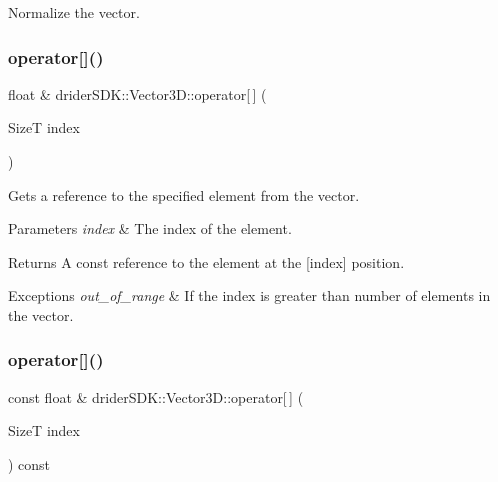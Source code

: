 Normalize the vector. \mbox{\label{classdrider_s_d_k_1_1_vector3_d_ac7f67c8043cc9f9d801a7e7a2f2580a7}} 
\subsubsection{\texorpdfstring{operator[]()}{operator[]()}\hspace{0.1cm}{\footnotesize\ttfamily [1/2]}}
{\footnotesize\ttfamily float \& drider\+S\+D\+K\+::\+Vector3\+D\+::operator\mbox{[}$\,$\mbox{]} (\begin{DoxyParamCaption}\item[{SizeT}]{index }\end{DoxyParamCaption})}

Gets a reference to the specified element from the vector.


\begin{DoxyParams}{Parameters}
{\em index} & The index of the element.\\
\hline
\end{DoxyParams}
\begin{DoxyReturn}{Returns}
A const reference to the element at the \mbox{[}index\mbox{]} position.
\end{DoxyReturn}

\begin{DoxyExceptions}{Exceptions}
{\em out\+\_\+of\+\_\+range} & If the index is greater than number of elements in the vector. \\
\hline
\end{DoxyExceptions}
\mbox{\label{classdrider_s_d_k_1_1_vector3_d_a54c01f85259ba8f84eb37dcf1001e59e}} 
\subsubsection{\texorpdfstring{operator[]()}{operator[]()}\hspace{0.1cm}{\footnotesize\ttfamily [2/2]}}
{\footnotesize\ttfamily const float \& drider\+S\+D\+K\+::\+Vector3\+D\+::operator\mbox{[}$\,$\mbox{]} (\begin{DoxyParamCaption}\item[{SizeT}]{index }\end{DoxyParamCaption}) const}

